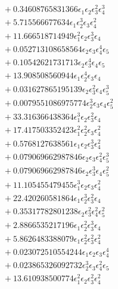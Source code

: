 \documentclass[10pt]{article}
\begin{document}
\begin{align*}
&{}  + 0.34608765831366 \epsilon_{1} \epsilon_{2} \epsilon_{3}^{2} \epsilon_{4}^{3} \\
&{}  + 5.715566677634 \epsilon_{1} \epsilon_{2}^{3} \epsilon_{3} \epsilon_{4}^{2} \\
&{}  + 11.666518714949 \epsilon_{1}^{2} \epsilon_{2} \epsilon_{3}^{3} \epsilon_{4} \\
&{}  + 0.052713108658564 \epsilon_{2} \epsilon_{3} \epsilon_{4}^{4} \epsilon_{5} \\
&{}  + 0.10542621731713 \epsilon_{2} \epsilon_{3}^{4} \epsilon_{4} \epsilon_{5} \\
&{}  + 13.908508560944 \epsilon_{1} \epsilon_{2}^{4} \epsilon_{3} \epsilon_{4} \\
&{}  + 0.031627865195139 \epsilon_{2} \epsilon_{3}^{2} \epsilon_{4} \epsilon_{5}^{3} \\
&{}  + 0.0079551086975774 \epsilon_{2}^{3} \epsilon_{3} \epsilon_{4} \epsilon_{5}^{2} \\
&{}  + 33.316366438364 \epsilon_{1}^{3} \epsilon_{2} \epsilon_{3}^{2} \epsilon_{4} \\
&{}  + 17.417503352423 \epsilon_{1}^{2} \epsilon_{2}^{2} \epsilon_{3} \epsilon_{4}^{2} \\
&{}  + 0.5768127638561 \epsilon_{1} \epsilon_{2} \epsilon_{3}^{3} \epsilon_{4}^{2} \\
&{}  + 0.079069662987846 \epsilon_{2} \epsilon_{3} \epsilon_{4}^{2} \epsilon_{5}^{3} \\
&{}  + 0.079069662987846 \epsilon_{2} \epsilon_{3}^{3} \epsilon_{4} \epsilon_{5}^{2} \\
&{}  + 11.105455479455 \epsilon_{1}^{3} \epsilon_{2} \epsilon_{3} \epsilon_{4}^{2} \\
&{}  + 22.420260581864 \epsilon_{1} \epsilon_{2}^{3} \epsilon_{3}^{2} \epsilon_{4} \\
&{}  + 0.35317782801238 \epsilon_{2} \epsilon_{3}^{2} \epsilon_{4}^{2} \epsilon_{5}^{2} \\
&{}  + 2.8866535217196 \epsilon_{1} \epsilon_{2}^{2} \epsilon_{3}^{3} \epsilon_{4} \\
&{}  + 5.8626483388079 \epsilon_{1} \epsilon_{2}^{2} \epsilon_{3}^{2} \epsilon_{4}^{2} \\
&{}  + 0.023072510554244 \epsilon_{1} \epsilon_{2} \epsilon_{3} \epsilon_{4}^{4} \\
&{}  + 0.023865326092732 \epsilon_{2}^{3} \epsilon_{3} \epsilon_{4}^{2} \epsilon_{5} \\
&{}  + 13.610938500774 \epsilon_{1}^{2} \epsilon_{2} \epsilon_{3}^{2} \epsilon_{4}^{2} \\

\end{align*}
\end{document}
